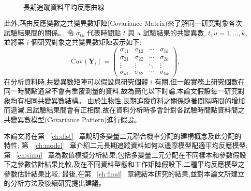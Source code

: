 \begin{figure}[h]
    \centering
       \\
       \caption{長期追蹤資料平均反應曲線}
    \label{fig:meancurve}
\end{figure}

此外,藉由反應變數之共變異數矩陣(Covariance Matrix)來了解同一研究對象各次試驗結果間的關係。
令 $\sigma_{tu}$ 代表時間點 $t$ 與 $u$ 試驗結果的共變異數, $t,u=1,\ldots,k$, 並將第 $i$ 個研究對象之共變異數矩陣表示如下:
$$\mbox{Cov}(\bm{Y}_i)=\left(
            \begin{array}{cccc}
             \sigma_{11}     &\sigma_{12}    &\cdots &\sigma_{1k} \\
             \sigma_{21}    &\sigma_{22}     &\cdots &\sigma_{2k} \\
             \vdots         &\vdots         &\ddots &\vdots  \\
             \sigma_{k1}    &\sigma_{k2}    &\cdots &\sigma_{kk}
            \end{array} \right),$$
在分析資料時,共變異數矩陣可以假設與研究個體 $i$ 有關,但一般實務上研究個數在同一時間點通常不會有重覆測量的資料,故為簡化以下討論,本論文假設每一研究對象均有相同共變異數結構。
由於生物性,長期追蹤資料之關係隨著間隔時間的增加而遞減,且試驗結果間會有正相關,故在資料分析時多會針對各試驗時間點資料間之共變異數模型(Covariance Pattern)進行假設。

本論文將在第~ \ref{ch:dist} ~章說明多變量二元聯合機率分配的建構概念及此分配的特性;
第~ \ref{ch:model} ~章介紹二元長期追蹤資料如何以邊際模型配適平均反應模型;
第~ \ref{ch:simu} ~章為數值模擬分析結果,包括多變量二元分配在不同樣本和參數假設下之參數估計結果比較,及在不同資料型態和工作矩陣假設下,二種平均反應模型之參數估計結果比較;
最後,在第~ \ref{ch:final} ~章總結本研究的結果,並對本論文所建立的分析方法及後續研究提出建議。

%


